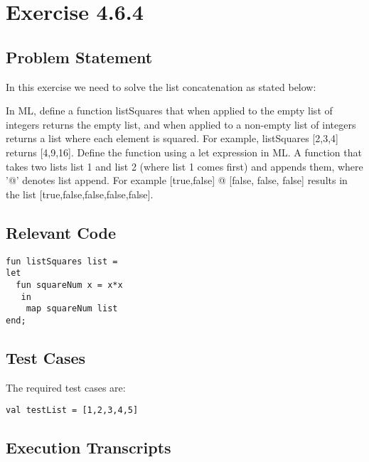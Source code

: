 \documentclass{report}
\begin{document}

\chapter{Exercise 4.6.4}
\label{cha:exercise-4.6.4}

\section{Problem Statement}
\label{sec:problem-statement-2}
In this exercise we need to solve the list concatenation as stated below:

  In ML, define a function listSquares that when applied to the empty
  list of integers returns the empty list, and when applied to a
  non-empty list of integers returns a list where each element is
  squared. For example, listSquares [2,3,4] returns [4,9,16]. Define
  the function using a let expression in ML. A function that takes two
  lists list 1 and list 2 (where list 1 comes first) and appends them,
  where '@' denotes list append. For example [true,false] @ [false,
  false, false] results in the list [true,false,false,false,false].


\section{Relevant Code}
\label{sec:relevant-code-2}

\lstset{frameround=tttt}
\begin{lstlisting}[frame=tRBL]
 fun listSquares list =
let
  fun squareNum x = x*x
   in
    map squareNum list
end;
\end{lstlisting}

\section{Test Cases}
\label{sec:test-cases-2}

The required test cases are:
\begin{lstlisting}[frame = tRBL ]
val testList = [1,2,3,4,5]
\end{lstlisting}


\section{Execution Transcripts}
\label{sec:exec-transcr-2}
\end{document}
